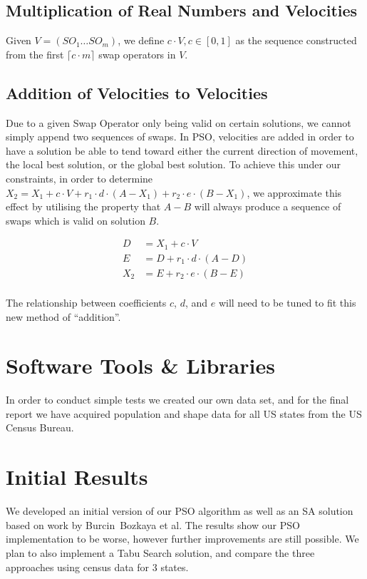 \documentclass[journal]{IEEEtran}
\begin{document}
\subsection{Multiplication of Real Numbers and Velocities}
Given $V = (SO_1 \dots SO_m)$, we define $c \cdot V, c \in [0, 1]$ as the
sequence constructed from the first $\lceil c \cdot m \rceil$ swap operators in $V$.

\subsection{Addition of Velocities to Velocities}
Due to a given Swap Operator only being valid on certain solutions, we cannot
simply append two sequences of swaps.  In PSO, velocities are added in order to
have a solution be able to tend toward either the current direction of movement,
the local best solution, or the global best solution.  To achieve this under our
constraints, in order to determine $X_2 = X_1 + c\cdot V + r_1 \cdot d \cdot (A
- X_1) + r_2 \cdot e \cdot (B - X_1)$, we approximate this effect by utilising
the property that $A - B$ will always produce a sequence of swaps which is valid
on solution $B$.

\begin{equation}
\label{vel_encoding}
    \begin{aligned}
        D &= X_1 + c \cdot V\\
        E &= D + r_1 \cdot d \cdot (A - D)\\
        X_2 &= E + r_2 \cdot e \cdot (B - E)\\
    \end{aligned}
\end{equation}

The relationship between coefficients $c$, $d$, and $e$ will need to be tuned to fit this new method of
``addition''.

\section{Software Tools \& Libraries}
In order to conduct simple tests we created our own data set, and for the final
report we have acquired population and shape data for all US states from the
US Census Bureau.

\section{Initial Results}
We developed an initial version of our PSO algorithm as well as an SA
solution based on work by Burcin~Bozkaya et al\cite{local-search}.  The
results show our PSO implementation to be worse, however further improvements
are still possible.  We plan to also implement a Tabu Search solution, and
compare the three approaches using census data for 3 states.
\end{document}
